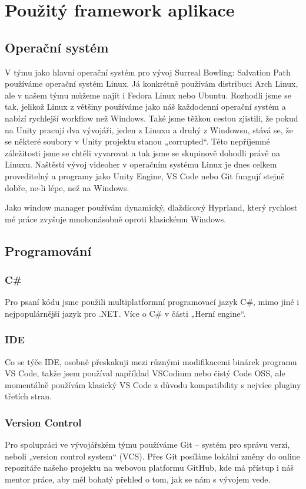 \chapter{Použitý framework aplikace}

\section{Operační systém}
V týmu jako hlavní operační systém pro vývoj Surreal Bowling: Salvation Path používáme operační systém Linux. Já konkrétně používám distribuci Arch Linux, ale v našem týmu můžeme najít i Fedora Linux nebo Ubuntu. Rozhodli jsme se tak, jelikož Linux z většiny používáme jako náš každodenní operační systém a nabízí rychlejší workflow než Windows. Také jsme těžkou cestou zjistili, že pokud na Unity pracují dva vývojáři, jeden z Linuxu a druhý z Windowsu, stává se, že se některé soubory v Unity projektu stanou „corrupted“. Této nepříjemné záležitosti jsme se chtěli vyvarovat a tak jsme se skupinově dohodli právě na Linuxu. Naštěstí vývoj videoher v operačním systému Linux je dnes celkem proveditelný a programy jako Unity Engine, VS Code nebo Git fungují stejně dobře, ne-li lépe, než na Windows.

Jako window manager používám dynamický, dlaždicový Hyprland, který rychlost mé práce zvyšuje mnohonásobně oproti klasickému Windows.

\section{Programování}

\subsection{C\#}
Pro psaní kódu jsme použili multiplatformní programovací jazyk C\#, mimo jiné i nejpopulárnější jazyk pro .NET. Více o C\# v části „Herní engine“.

\subsection{IDE}
Co se týče IDE, osobně přeskakuji mezi různými modifikacemi binárek programu VS Code, takže jsem používal například VSCodium nebo čistý Code OSS, ale momentálně používám klasický VS Code z důvodu kompatibility s nejvíce pluginy třetích stran.

\subsection{Version Control}
Pro spolupráci ve vývojářském týmu používáme Git – systém pro správu verzí, neboli „version control system“ (VCS). Přes Git posíláme lokální změny do online repozitáře našeho projektu na webovou platformu GitHub, kde má přístup i náš mentor práce, aby měl bohatý přehled o tom, jak se nám s vývojem vede. 

